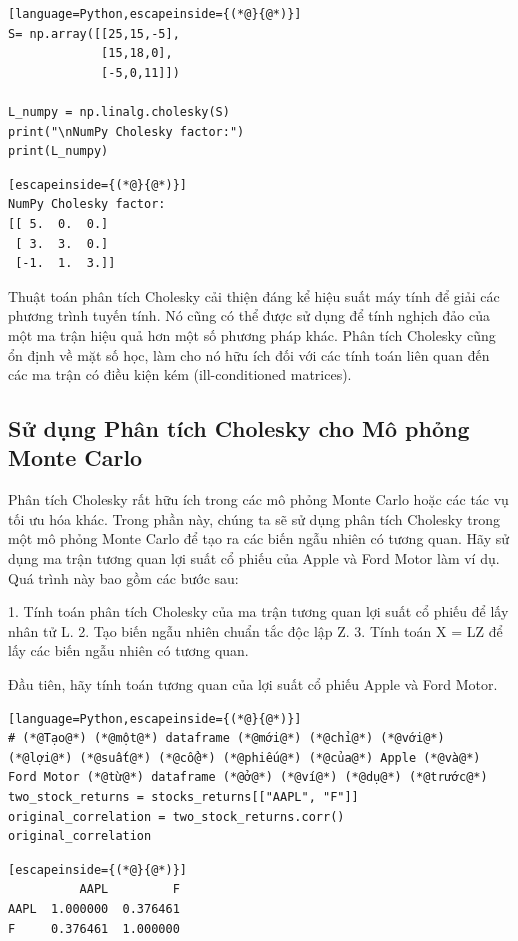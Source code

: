 \begin{lstlisting}[language=Python,escapeinside={(*@}{@*)}]
S= np.array([[25,15,-5],
             [15,18,0],
             [-5,0,11]])

L_numpy = np.linalg.cholesky(S)
print("\nNumPy Cholesky factor:")
print(L_numpy)
\end{lstlisting}

\begin{lstlisting}[escapeinside={(*@}{@*)}]
NumPy Cholesky factor:
[[ 5.  0.  0.]
 [ 3.  3.  0.]
 [-1.  1.  3.]]
\end{lstlisting}

Thuật toán phân tích Cholesky cải thiện đáng kể hiệu suất máy tính để giải các phương trình tuyến tính. Nó cũng có thể được sử dụng để tính nghịch đảo của một ma trận hiệu quả hơn một số phương pháp khác. Phân tích Cholesky cũng ổn định về mặt số học, làm cho nó hữu ích đối với các tính toán liên quan đến các ma trận có điều kiện kém (ill-conditioned matrices).

\subsection{Sử dụng Phân tích Cholesky cho Mô phỏng Monte Carlo}

Phân tích Cholesky rất hữu ích trong các mô phỏng Monte Carlo hoặc các tác vụ tối ưu hóa khác. Trong phần này, chúng ta sẽ sử dụng phân tích Cholesky trong một mô phỏng Monte Carlo để tạo ra các biến ngẫu nhiên có tương quan. Hãy sử dụng ma trận tương quan lợi suất cổ phiếu của Apple và Ford Motor làm ví dụ. Quá trình này bao gồm các bước sau:

1. Tính toán phân tích Cholesky của ma trận tương quan lợi suất cổ phiếu để lấy nhân tử L. 2. Tạo biến ngẫu nhiên chuẩn tắc độc lập Z. 3. Tính toán X = LZ để lấy các biến ngẫu nhiên có tương quan.

Đầu tiên, hãy tính toán tương quan của lợi suất cổ phiếu Apple và Ford Motor.

\begin{lstlisting}[language=Python,escapeinside={(*@}{@*)}]
# (*@Tạo@*) (*@một@*) dataframe (*@mới@*) (*@chỉ@*) (*@với@*) (*@lợi@*) (*@suất@*) (*@cổ@*) (*@phiếu@*) (*@của@*) Apple (*@và@*) Ford Motor (*@từ@*) dataframe (*@ở@*) (*@ví@*) (*@dụ@*) (*@trước@*)
two_stock_returns = stocks_returns[["AAPL", "F"]]
original_correlation = two_stock_returns.corr()
original_correlation
\end{lstlisting}

\begin{lstlisting}[escapeinside={(*@}{@*)}]
          AAPL         F
AAPL  1.000000  0.376461
F     0.376461  1.000000
\end{lstlisting}

